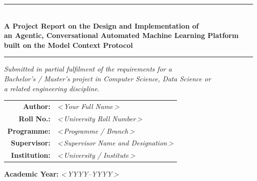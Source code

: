 \begin{titlepage}
\begin{center}
\vspace*{0.5cm}

{\LARGE\bfseries\projname\par}
\vspace{0.3cm}
{\Large\itshape \projtag\par}
\vspace{2cm}

\rule{\linewidth}{0.5mm}\\[0.6cm]
{\Large\bfseries A Project Report on the Design and Implementation of\\[0.3cm]
an Agentic, Conversational Automated Machine Learning Platform\\[0.3cm]
built on the Model Context Protocol}\\[0.4cm]
\rule{\linewidth}{0.5mm}

\vspace{2cm}

\textit{Submitted in partial fulfilment of the requirements for a\\
Bachelor's / Master's project in Computer Science, Data Science or\\
a related engineering discipline.}

\vspace{2.5cm}

\begin{tabular}{rl}
\textbf{Author:} & \emph{\textless\,Your Full Name\,\textgreater} \\[0.3cm]
\textbf{Roll No.:} & \emph{\textless\,University Roll Number\,\textgreater} \\[0.3cm]
\textbf{Programme:} & \emph{\textless\,Programme / Branch\,\textgreater} \\[0.3cm]
\textbf{Supervisor:} & \emph{\textless\,Supervisor Name and Designation\,\textgreater} \\[0.3cm]
\textbf{Institution:} & \emph{\textless\,University / Institute\,\textgreater} \\
\end{tabular}

\vfill

{\large \textbf{Academic Year:} \textit{\textless\,YYYY--YYYY\,\textgreater}}

\vspace{0.8cm}
\end{center}
\end{titlepage}
